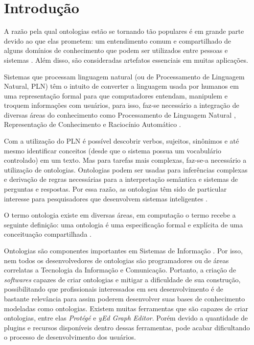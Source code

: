 \documentclass{bcc}
\begin{document}

\renewcommand\contentsname{\centerline{Sumário}}
\renewcommand\listfigurename{\centerline{Lista de Figuras}}
\renewcommand\listtablename{\centerline{Lista de Tabelas}}

\tableofcontents

\listoffigures
{}

\listoftables
{}

\inicio
\chapter{Introdução}

A razão pela qual ontologias estão se tornando tão populares é em grande parte devido ao que elas prometem: um entendimento comum e compartilhado de alguns domínios de conhecimento que podem ser utilizados entre pessoas e sistemas \cite{fensel2001}. Além disso, são consideradas artefatos essenciais em muitas aplicações.

Sistemas que processam linguagem natural (ou de Processamento de Linguagem Natural, PLN) têm o intuito de converter a linguagem usada por humanos em uma representação formal para que computadores entendam, manipulem e troquem informações com usuários, para isso, faz-se necessário a integração de diversas áreas do conhecimento como Processamento de Linguagem Natural \cite{brill1995}, Representação de Conhecimento \cite{levesque1986} e Raciocínio Automático \cite{wos1984}.

Com a utilização do PLN é possível descobrir verbos, sujeitos, sinônimos e até mesmo identificar conceitos (desde que o sistema possua um vocabulário controlado) em um texto. Mas para tarefas mais complexas, faz-se-a necessário a utilização de ontologias. Ontologias podem ser usadas para inferências complexas e derivação de regras necessárias para a interpretação semântica e sistemas de perguntas e respostas. Por essa razão, as ontologias têm sido de particular interesse para pesquisadores que desenvolvem sistemas inteligentes \cite{liu2011}.

O termo ontologia existe em diversas áreas, em computação o termo recebe a seguinte definição: uma ontologia é uma especificação formal e explícita de uma conceituação compartilhada \cite{gruber1995}.

Ontologias são componentes importantes em Sistemas de Informação \cite{estival2004}. Por isso, nem todos os desenvolvedores de ontologias são programadores ou de áreas correlatas a Tecnologia da Informação e Comunicação. Portanto, a criação de \textit{softwares} capazes de criar ontologias e mitigar a dificuldade de sua construção, possibilitando que profissionais interessados em seu desenvolvimento é de bastante relevância para assim poderem desenvolver suas bases de conhecimento modeladas como ontologias. Existem muitas ferramentas que são capazes de criar ontologias, entre elas \textit{Protégé} \cite{noy2001} e \textit{yEd Graph Editor}. Porém devido a quantidade de plugins e recursos disponíveis dentro dessas ferramentas, pode acabar dificultando o processo de desenvolvimento dos usuários.
\end{document}
